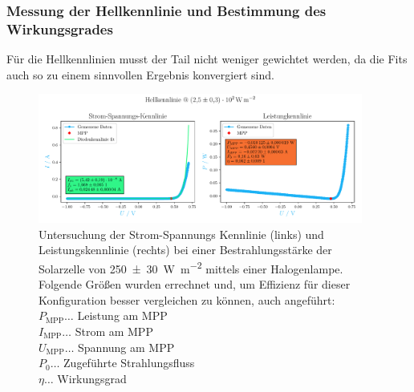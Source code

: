 \documentclass[12pt,english,ngerman]{scrartcl}
\begin{document}
\subsubsection{Messung der Hellkennlinie und Bestimmung des Wirkungsgrades}

Für die Hellkennlinien musst der Tail nicht weniger gewichtet werden, da die
Fits auch so zu einem sinnvollen Ergebnis konvergiert sind.

\begin{figure}[H]
	\centering
	\includegraphics[width=0.95\textwidth]{figures/helllampe.pdf}
	\caption[Kennlinie durch Halogen-Lampen 1.te Belichtung]{Untersuchung der
		Strom-Spannungs Kennlinie (links) und Leistungskennlinie (rechts) bei einer
		Bestrahlungsstärke der Solarzelle von \SI{250(30)}{\watt\per\meter\squared}
		mittels einer Halogenlampe. Folgende Größen wurden errechnet und, um Effizienz
		für dieser Konfiguration besser vergleichen zu können, auch angeführt: \\
		$P_\text{MPP} \dots$ Leistung am MPP                                   \\
		$I_\text{MPP} \dots$ Strom am MPP                                      \\
		$U_\text{MPP} \dots$ Spannung am MPP                                   \\
		$P_0 \dots$ Zugeführte Strahlungsfluss                                 \\
		$\eta \dots$ Wirkungsgrad
	}\label{fig:ausw_kennlinie_hell_lampe}
\end{figure}
\end{document}
